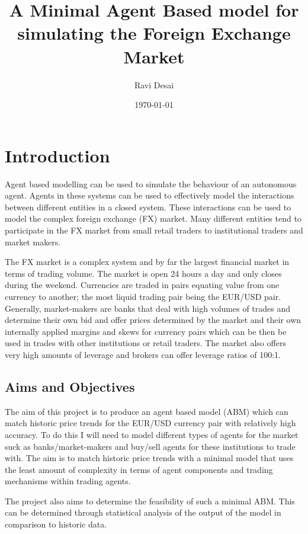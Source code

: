 \documentclass[11pt]{informatics-report}
\title{A Minimal Agent Based model for simulating the Foreign Exchange Market}
\author{Ravi Desai}
\date{\today}
\begin{document}
\createFrontMatter
\onehalfspacing
\tableofcontents
\doublespacing


\chapter{Introduction}
Agent based modelling can be used to simulate the behaviour of an autonomous agent. Agents in these systems can be used to effectively model the interactions between different entities in a closed system. These interactions can be used to model the complex foreign exchange (FX) market. Many different entities tend to participate in the FX market from small retail traders to institutional traders and market makers.

The FX market is a complex system and by far the largest financial market in terms of trading volume. The market is open 24 hours a day and only closes during the weekend. Currencies are traded in pairs equating value from one currency to another; the most liquid trading pair being the EUR/USD pair. Generally, market-makers are banks that deal with high volumes of trades and determine their own bid and offer prices determined by the market and their own internally applied margins and skews for currency pairs which can be then be used in trades with other institutions or retail traders. The market also offers very high amounts of leverage and brokers can offer leverage ratios of 100:1. \cite{leverage}



\section{Aims and Objectives}
The aim of this project is to produce an agent based model (ABM) which can match historic price trends for the EUR/USD currency pair with relatively high accuracy. To do this I will need to model different types of agents for the market suck as banks/market-makers and buy/sell agents for these institutions to trade with. The aim is to match historic price trends with a minimal model that uses the least amount of complexity in terms of agent components and trading mechanisms within trading agents.

The project also aims to determine the feasibility of such a minimal ABM. This can be determined through statistical analysis of the output of the model in comparison to historic data.
\end{document}
